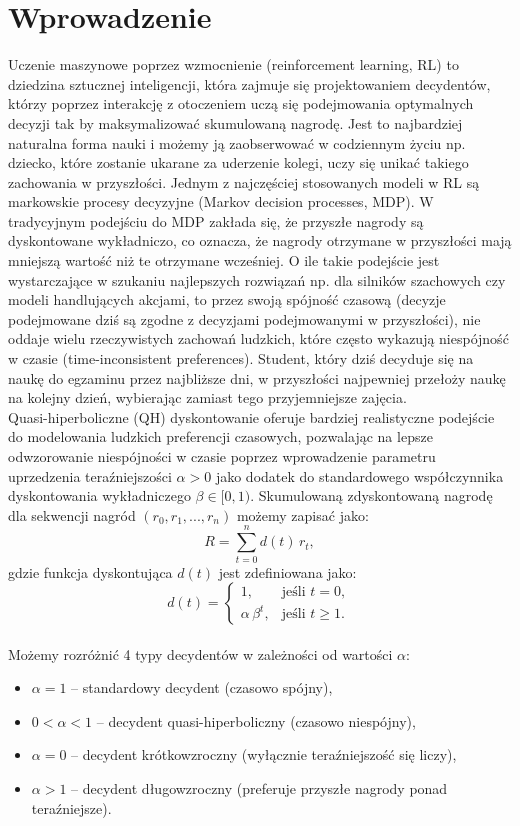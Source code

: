 \chapter{Wprowadzenie}

Uczenie maszynowe poprzez wzmocnienie (reinforcement learning, RL) to dziedzina sztucznej inteligencji, która zajmuje się projektowaniem decydentów, którzy poprzez interakcję z otoczeniem uczą się podejmowania optymalnych decyzji tak by maksymalizować skumulowaną nagrodę. Jest to najbardziej naturalna forma nauki i możemy ją zaobserwować w codziennym życiu np. dziecko, które zostanie ukarane za uderzenie kolegi, uczy się unikać takiego zachowania w przyszłości. Jednym z najczęściej stosowanych modeli w RL są markowskie procesy decyzyjne (Markov decision processes, MDP). W tradycyjnym podejściu do MDP zakłada się, że przyszłe nagrody są dyskontowane wykładniczo, co oznacza, że nagrody otrzymane w przyszłości mają mniejszą wartość niż te otrzymane wcześniej. O ile takie podejście jest wystarczające w szukaniu najlepszych rozwiązań np. dla silników szachowych czy modeli handlujących akcjami, to przez swoją spójność czasową (decyzje podejmowane dziś są zgodne z decyzjami podejmowanymi w przyszłości), nie oddaje wielu rzeczywistych zachowań ludzkich, które często wykazują niespójność w czasie (time-inconsistent preferences). Student, który dziś decyduje się na naukę do egzaminu przez najbliższe dni, w przyszłości najpewniej przełoży naukę na kolejny dzień, wybierając zamiast tego przyjemniejsze zajęcia. \\
Quasi-hiperboliczne (QH) dyskontowanie oferuje bardziej realistyczne podejście do modelowania ludzkich preferencji czasowych, pozwalając na lepsze odwzorowanie niespójności w czasie poprzez wprowadzenie parametru uprzedzenia teraźniejszości $\alpha > 0$ jako dodatek do standardowego współczynnika dyskontowania wykładniczego $\beta \in [0,1)$. Skumulowaną zdyskontowaną nagrodę dla sekwencji nagród $(r_0, r_1,...,r_n)$ możemy zapisać jako:
\begin{equation}
  R = \sum_{t=0}^{n} d(t)\, r_t,
\end{equation}
gdzie funkcja dyskontująca $d(t)$ jest zdefiniowana jako:
\begin{equation}
  d(t) = 
  \begin{cases}
	1, & \text{jeśli } t = 0, \\
	\alpha\,\beta^{t}, & \text{jeśli } t \ge 1.
  \end{cases}
\end{equation}
\\ 
Możemy rozróżnić 4 typy decydentów w zależności od wartości $\alpha$:
\begin{itemize}
	\item $\alpha = 1$ -- standardowy decydent (czasowo spójny),
	\item $0 < \alpha < 1$ -- decydent quasi-hiperboliczny (czasowo niespójny),
	\item $\alpha = 0$ -- decydent krótkowzroczny (wyłącznie teraźniejszość się liczy),
	\item $\alpha > 1$ -- decydent długowzroczny (preferuje przyszłe nagrody ponad teraźniejsze).
\end{itemize}

